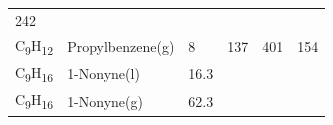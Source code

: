 \documentclass[
  9pt,
]{extbook}
\theoremstyle{definition}
\theoremstyle{definition}
\theoremstyle{definition}
\theoremstyle{remark}
\begin{document}
\begin{longtable}[]{@{}llllll@{}}
\begin{minipage}[t]{0.14\columnwidth}
242\strut
\end{minipage}\tabularnewline
\begin{minipage}[t]{0.07\columnwidth}\raggedright
C\textsubscript{9}H\textsubscript{12}\strut
\end{minipage} & \begin{minipage}[t]{0.17\columnwidth}\raggedright
Propylbenzene(g)\strut
\end{minipage} & \begin{minipage}[t]{0.15\columnwidth}\raggedright
8\strut
\end{minipage} & \begin{minipage}[t]{0.15\columnwidth}\raggedright
137\strut
\end{minipage} & \begin{minipage}[t]{0.14\columnwidth}\raggedright
401\strut
\end{minipage} & \begin{minipage}[t]{0.14\columnwidth}\raggedright
154\strut
\end{minipage}\tabularnewline
\begin{minipage}[t]{0.07\columnwidth}\raggedright
C\textsubscript{9}H\textsubscript{16}\strut
\end{minipage} & \begin{minipage}[t]{0.17\columnwidth}\raggedright
1-Nonyne(l)\strut
\end{minipage} & \begin{minipage}[t]{0.15\columnwidth}\raggedright
16.3\strut
\end{minipage} & \begin{minipage}[t]{0.15\columnwidth}\raggedright
\strut
\end{minipage} & \begin{minipage}[t]{0.14\columnwidth}\raggedright
\strut
\end{minipage} & \begin{minipage}[t]{0.14\columnwidth}\raggedright
\strut
\end{minipage}\tabularnewline
\begin{minipage}[t]{0.07\columnwidth}\raggedright
C\textsubscript{9}H\textsubscript{16}\strut
\end{minipage} & \begin{minipage}[t]{0.17\columnwidth}\raggedright
1-Nonyne(g)\strut
\end{minipage} & \begin{minipage}[t]{0.15\columnwidth}\raggedright
62.3\strut
\end{minipage} & \begin{minipage}[t]{0.15\columnwidth}\raggedright

\end{minipage}
\end{longtable}
\end{document}
